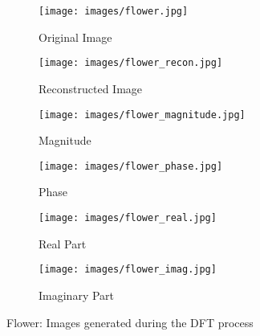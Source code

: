 \begin{figure}[htbp]
    \centering 
    \begin{minipage}{0.8\textwidth} 
        \centering 
        
        \begin{subfigure}[b]{0.45\linewidth} 
            \texttt{[image: images/flower.jpg]}
            \caption{Original Image}
        \end{subfigure}
        \hfill
        \begin{subfigure}[b]{0.45\linewidth}
            \texttt{[image: images/flower\_recon.jpg]}
            \caption{Reconstructed Image}
        \end{subfigure}

        \vspace{0.5cm}
        \begin{subfigure}[b]{0.45\linewidth}
            \texttt{[image: images/flower\_magnitude.jpg]}
            \caption{Magnitude}
        \end{subfigure}
        \hfill
        \begin{subfigure}[b]{0.45\linewidth}
            \texttt{[image: images/flower\_phase.jpg]}
            \caption{Phase}
        \end{subfigure}

        \vspace{0.5cm}
        \begin{subfigure}[b]{0.45\linewidth}
            \texttt{[image: images/flower\_real.jpg]}
            \caption{Real Part}
        \end{subfigure}
        \hfill
        \begin{subfigure}[b]{0.45\linewidth}
            \texttt{[image: images/flower\_imag.jpg]}
            \caption{Imaginary Part}
        \end{subfigure}

        \caption{Flower: Images generated during the DFT process}
        \label{fig:flower_1}
    \end{minipage}
\end{figure}

